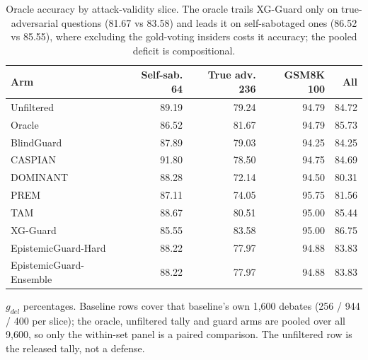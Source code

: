 \begin{table}[htbp]
\centering
\small
\caption{Oracle accuracy by attack-validity slice. The oracle trails XG-Guard only on true-adversarial questions (81.67 vs 83.58) and leads it on self-sabotaged ones (86.52 vs 85.55), where excluding the gold-voting insiders costs it accuracy; the pooled deficit is compositional.}
\label{tab:oracle-paradox}
\begin{tabular}{lrrrr}
\toprule
Arm & Self-sab. 64 & True adv. 236 & GSM8K 100 & All \\
\midrule
Unfiltered & 89.19 & 79.24 & 94.79 & 84.72 \\
Oracle & 86.52 & 81.67 & 94.79 & 85.73 \\
BlindGuard & 87.89 & 79.03 & 94.25 & 84.25 \\
CASPIAN & 91.80 & 78.50 & 94.75 & 84.69 \\
DOMINANT & 88.28 & 72.14 & 94.50 & 80.31 \\
PREM & 87.11 & 74.05 & 95.75 & 81.56 \\
TAM & 88.67 & 80.51 & 95.00 & 85.44 \\
XG-Guard & 85.55 & 83.58 & 95.00 & 86.75 \\
EpistemicGuard-Hard & 88.22 & 77.97 & 94.88 & 83.83 \\
EpistemicGuard-Ensemble & 88.22 & 77.97 & 94.88 & 83.83 \\
\bottomrule
\end{tabular}
\par\smallskip\footnotesize $g_{del}$ percentages. Baseline rows cover that baseline's own 1,600 debates (256 / 944 / 400 per slice); the oracle, unfiltered tally and guard arms are pooled over all 9,600, so only the within-set panel is a paired comparison. The unfiltered row is the released tally, not a defense.
\end{table}

